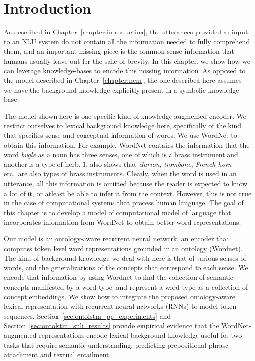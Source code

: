 \section{Introduction}
As described in Chapter~\ref{chapter:introduction}, the utterances provided as input to
an NLU system do not contain all the information needed to fully comprehend them, and an
important missing piece is the common-sense information that humans usually leave out for
the sake of brevity. In this chapter, we show how we can leverage knowledge-bases to encode
this missing information. As opposed to the model described in Chapter~\ref{chapter:nem},
the one described here assumes we have the background knowledge explicitly present in a
symbolic knowledge base.

The model shown here is one specific kind of knowledge augmented encoder. We 
restrict ourselves to lexical background knowledge here, specifically of the kind that
specifies sense and conceptual information of words. We use WordNet \citep{miller1995wordnet}
to obtain this information. For example, WordNet contains the information that the word
\textit{bugle} as a noun has three senses, one of which is a brass instrument and another
is a type of herb. It also shows that \textit{clarion}, \textit{trombone}, \textit{French horn} etc.\
are also types of brass instruments. Clearly, when the word is used in an utterance, all this information
is omitted because the reader is expected to know a lot of it, or atleast be able to infer it from
the context. However, this is not true in the case of computational systems that process human language.
The goal of this chapter is to develop a model of computational model of language that incorporates 
information from WordNet to obtain better word representations.

Our model is an ontology-aware recurrent neural network, an encoder that computes token level 
word representations grounded in an ontology (Wordnet).
The kind of background knowledge we deal with here is that of various senses of
words, and the generalizations of the concepts that correspond to each sense.
We encode that information by using Wordnet to find the 
collection of semantic concepts manifested by a word type, and represent a word 
type as a collection of concept embeddings. We show
how to integrate the proposed ontology-aware lexical representation with 
recurrent neural networks (RNNs) to model token sequences. Section~\ref{sec:ontolstm_pp_experiments}
and Section~\ref{sec:ontolstm_snli_results} provide empirical evidence that
the WordNet-augmented representations encode lexical background knowledge useful for
two tasks that require semantic understanding: predicting prepositional phrase attachment
and textual entailment.

